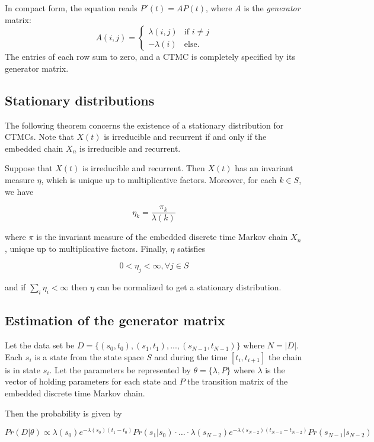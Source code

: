 \documentclass[
  nojss]{jss}
\begin{document}
In compact form, the equation reads \(P'(t) = AP(t)\), where \(A\) is the \emph{generator} matrix:
\[
A(i, j) = \begin{cases} \lambda(i, j) & \mbox{if } i \neq j \\ -\lambda(i) & \mbox{else.} \end{cases}
\]
The entries of each row sum to zero, and a CTMC is completely specified by its generator matrix.

\subsection{Stationary distributions}\label{stationary-distributions}

The following theorem concerns the existence of a stationary distribution for CTMCs. Note that \(X(t)\) is irreducible and recurrent if and only if the embedded chain \(X_n\) is irreducible and recurrent.

Suppose that \(X(t)\) is irreducible and recurrent. Then \(X(t)\) has an invariant measure \(\eta\), which is unique up to multiplicative factors. Moreover, for each \(k \in S\), we have

\[\eta_k = \frac{\pi_k}{\lambda(k)}\]

where \(\pi\) is the invariant measure of the embedded discrete time Markov chain \(X_n\), unique up to multiplicative factors. Finally, \(\eta\) satisfies

\[0 < \eta_j < \infty, \forall j \in S\]

and if \(\sum_i \eta_i < \infty\) then \(\eta\) can be normalized to get a stationary distribution.

\subsection{Estimation of the generator matrix}\label{estimation-of-the-generator-matrix}

Let the data set be \(D = \{(s_0, t_0), (s_1, t_1), ..., (s_{N-1}, t_{N-1})\}\) where \(N=|D|\). Each \(s_i\) is a state from the state space \(S\) and during the time \([t_i,t_{i+1}]\) the chain is in state \(s_i\). Let the parameters be represented by \(\theta = \{\lambda, P\}\) where \(\lambda\) is the vector of holding parameters for each state and \(P\) the transition matrix of the embedded discrete time Markov chain.

Then the probability is given by

\[
{Pr(D | \theta) \propto \lambda(s_0)e^{-\lambda(s_0)(t_1-t_0)}Pr(s_1|s_0) \cdot\ldots\cdot \lambda(s_{N-2})e^{-\lambda(s_{N-2})(t_{N-1}-t_{N-2})}Pr(s_{N-1}|s_{N-2})}
\]
\end{document}
